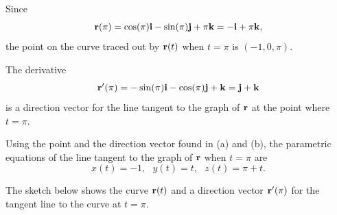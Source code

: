 \begin{activitySolution}
    \ba
    \item Since
    \[\mathbf{r}(\pi) = \cos(\pi) \mathbf{i} - \sin(\pi) \mathbf{j} + \pi \mathbf{k} = -\mathbf{i} + \pi \mathbf{k},\]
the point on the curve traced out by $\mathbf{r}(t)$ when $t = \pi$ is $(-1,0,\pi)$. 
    \item The derivative 
\[\mathbf{r}'(\pi) = -\sin(\pi)\mathbf{i} - \cos(\pi)\mathbf{j} + \mathbf{k} = \mathbf{j} + \mathbf{k}\]
is a direction vector for the line tangent to the graph of $\mathbf{r}$ at the point where $t=\pi$.
    \item Using the point and the direction vector found in (a) and (b), the parametric equations of the line tangent to the graph of $\mathbf{r}$ when $t=\pi$ are
\[x(t) = -1, \ \ \ y(t) = t, \ \ \ z(t) = \pi+t.\]
    \item The sketch below shows the curve $\mathbf{r}(t)$ and a direction vector $\mathbf{r}'(\pi)$ for the tangent line to the curve at $t=\pi$. 
\begin{center}
\end{center}

    \ea
\end{activitySolution}
\aftera
